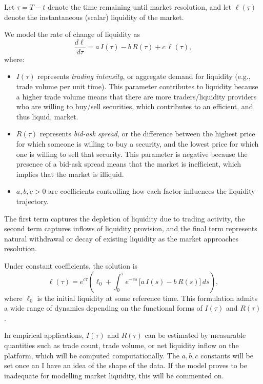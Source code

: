 \documentclass{article}
\begin{document}
Let \(\tau = T - t\) denote the time remaining until market resolution, and let \(\ell(\tau)\) denote the instantaneous (scalar) liquidity of the market.

We model the rate of change of liquidity as
\begin{equation}
\frac{d\ell}{d\tau} = a\,I(\tau) - b\,R(\tau) + c\,\ell(\tau),
\end{equation}
where:
\begin{itemize}
    \item \(I(\tau)\) represents \emph{trading intensity}, or aggregate demand for liquidity (e.g., trade volume per unit time). This parameter contributes to liquidity because a higher trade volume means that there are more traders/liquidity providers who are willing to buy/sell securities, which contributes to an efficient, and thus liquid, market.
    \item \(R(\tau)\) represents \emph{bid-ask spread}, or the difference between the highest price for which someone is willing to buy a security, and the lowest price for which one is willing to sell that security. This parameter is negative because the presence of a bid-ask spread means that the market is inefficient, which implies that the market is illiquid.
    \item \(a,b,c > 0\) are coefficients controlling how each factor influences the liquidity trajectory.
\end{itemize}

The first term captures the depletion of liquidity due to trading activity, the second term captures inflows of liquidity provision, and the final term represents natural withdrawal or decay of existing liquidity as the market approaches resolution.

Under constant coefficients, the solution is
\begin{equation}
\ell(\tau) = e^{c\tau}\!\left(\ell_0 
+ \int_{0}^{\tau} e^{-cs}\,\big[a\,I(s)-b\,R(s)\big]\,ds \right),
\end{equation}
where \(\ell_0\) is the initial liquidity at some reference time.  
This formulation admits a wide range of dynamics depending on the functional forms of \(I(\tau)\) and \(R(\tau)\).  

In empirical applications, \(I(\tau)\) and \(R(\tau)\) can be estimated by measurable quantities such as trade count, trade volume, or net liquidity inflow on the platform, which will be computed computationally.
The $a, b, c$ constants will be set once an I have an idea of the shape of the data. If the model proves to be inadequate for modelling market liquidity, this will be commented on.
\end{document}
